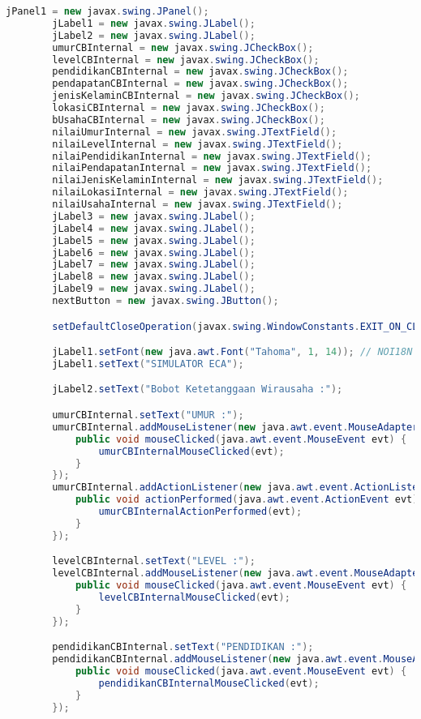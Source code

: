 \begin{lstlisting}[language=Java, caption=TampilanBobotKetetanggaan.java]
        jPanel1 = new javax.swing.JPanel();
        jLabel1 = new javax.swing.JLabel();
        jLabel2 = new javax.swing.JLabel();
        umurCBInternal = new javax.swing.JCheckBox();
        levelCBInternal = new javax.swing.JCheckBox();
        pendidikanCBInternal = new javax.swing.JCheckBox();
        pendapatanCBInternal = new javax.swing.JCheckBox();
        jenisKelaminCBInternal = new javax.swing.JCheckBox();
        lokasiCBInternal = new javax.swing.JCheckBox();
        bUsahaCBInternal = new javax.swing.JCheckBox();
        nilaiUmurInternal = new javax.swing.JTextField();
        nilaiLevelInternal = new javax.swing.JTextField();
        nilaiPendidikanInternal = new javax.swing.JTextField();
        nilaiPendapatanInternal = new javax.swing.JTextField();
        nilaiJenisKelaminInternal = new javax.swing.JTextField();
        nilaiLokasiInternal = new javax.swing.JTextField();
        nilaiUsahaInternal = new javax.swing.JTextField();
        jLabel3 = new javax.swing.JLabel();
        jLabel4 = new javax.swing.JLabel();
        jLabel5 = new javax.swing.JLabel();
        jLabel6 = new javax.swing.JLabel();
        jLabel7 = new javax.swing.JLabel();
        jLabel8 = new javax.swing.JLabel();
        jLabel9 = new javax.swing.JLabel();
        nextButton = new javax.swing.JButton();

        setDefaultCloseOperation(javax.swing.WindowConstants.EXIT_ON_CLOSE);

        jLabel1.setFont(new java.awt.Font("Tahoma", 1, 14)); // NOI18N
        jLabel1.setText("SIMULATOR ECA");

        jLabel2.setText("Bobot Ketetanggaan Wirausaha :");

        umurCBInternal.setText("UMUR :");
        umurCBInternal.addMouseListener(new java.awt.event.MouseAdapter() {
            public void mouseClicked(java.awt.event.MouseEvent evt) {
                umurCBInternalMouseClicked(evt);
            }
        });
        umurCBInternal.addActionListener(new java.awt.event.ActionListener() {
            public void actionPerformed(java.awt.event.ActionEvent evt) {
                umurCBInternalActionPerformed(evt);
            }
        });

        levelCBInternal.setText("LEVEL :");
        levelCBInternal.addMouseListener(new java.awt.event.MouseAdapter() {
            public void mouseClicked(java.awt.event.MouseEvent evt) {
                levelCBInternalMouseClicked(evt);
            }
        });

        pendidikanCBInternal.setText("PENDIDIKAN :");
        pendidikanCBInternal.addMouseListener(new java.awt.event.MouseAdapter() {
            public void mouseClicked(java.awt.event.MouseEvent evt) {
                pendidikanCBInternalMouseClicked(evt);
            }
        });


\end{lstlisting}
